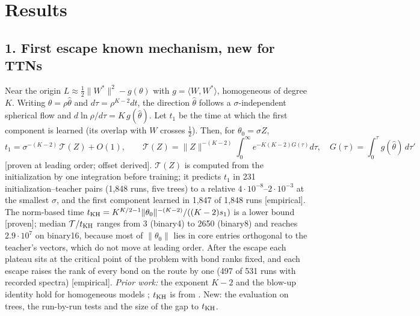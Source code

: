 \documentclass[11pt]{article}
\newcommand{\TTN}{\colorbox{Goldenrod!30}{\textsf{\small known mechanism, new for TTNs}}}
\newcommand{\ev}[1]{\textsf{\small[#1]}}
\begin{document}
\section{Results}

\subsection*{1. First escape \hfill\TTN}
Near the origin $L\approx\tfrac12\lVert W^*\rVert^2-g(\theta)$ with $g=\langle W,W^*\rangle$, homogeneous of degree
$K$. Writing $\theta=\rho\hat\theta$ and $d\tau=\rho^{K-2}dt$, the direction $\hat\theta$ follows a
$\sigma$-independent spherical flow and $d\ln\rho/d\tau=K\,g(\hat\theta)$. Let $t_1$ be the time at which the
first component is learned (its overlap with $W$ crosses $\tfrac12$). Then, for $\theta_0=\sigma Z$,
\begin{equation}\label{eq:first}
t_1=\sigma^{-(K-2)}\,\mathcal T(Z)+O(1),\qquad
\mathcal T(Z)=\lVert Z\rVert^{-(K-2)}\int_0^\infty e^{-K(K-2)G(\tau)}d\tau,\quad G(\tau)=\int_0^\tau g(\hat\theta)\,d\tau'
\end{equation}
\ev{proven at leading order; offset derived}. $\mathcal T(Z)$ is computed from the initialization by one
integration before training; it predicts $t_1$ in 231 initialization--teacher pairs (1,848 runs, five trees)
to a relative $4\cdot10^{-8}$--$2\cdot10^{-3}$ at the smallest $\sigma$, and the first component learned in
1,847 of 1,848 runs \ev{empirical}. The norm-based time
$t_{\rm KH}=K^{K/2-1}\lVert\theta_0\rVert^{-(K-2)}/((K-2)s_1)$ is a lower bound \ev{proven}; median
$\mathcal T/t_{\rm KH}$ ranges from 3 (binary4) to 2650 (binary8) and reaches $2.9\cdot10^7$ on binary16, because
most of $\lVert\theta_0\rVert$ lies in core entries orthogonal to the teacher's vectors, which do not move at
leading order.
After the escape each plateau sits at the critical point of the problem with bond ranks fixed, and each
escape raises the rank of every bond on the route by one (497 of 531 runs with recorded spectra)
\ev{empirical}.
\emph{Prior work:} the exponent $K-2$ and the blow-up identity hold for homogeneous models
\citep{kumar2025early,kunin2025alternating}; $t_{\rm KH}$ is from \citet{kumar2025towards}. New: the evaluation
on trees, the run-by-run tests and the size of the gap to $t_{\rm KH}$.
\end{document}
